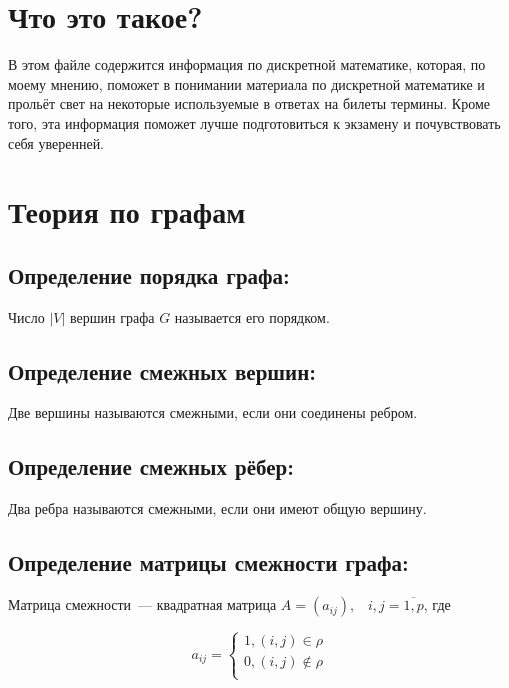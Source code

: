 \documentclass[14pt]{extarticle}
\begin{document}
\tableofcontents

\newpage

\section{Что это такое?}

В этом файле содержится информация по дискретной математике,
которая, по моему мнению, поможет в понимании материала по дискретной
математике и прольёт свет на некоторые используемые в ответах на билеты
термины. Кроме того, эта информация поможет лучше подготовиться к экзамену
и почувствовать себя уверенней.

\section{Теория по графам}

\subsection{Определение порядка графа:}

Число $|V|$ вершин графа $G$ называется его порядком.

\subsection{Определение смежных вершин:}

Две вершины называются смежными, если они соединены ребром.

\subsection{Определение смежных рёбер:}

Два ребра называются смежными, если они имеют общую вершину.

\subsection{Определение матрицы смежности графа:}

Матрица смежности~--- квадратная матрица $A = (a_{ij}), \;\;\; i, j = \overline{1, p}$,
где 

\[
    a_{ij} =
    \begin{cases}
        1, (i, j) \in \rho \\
        0, (i, j) \notin \rho\\
    \end{cases}  
\]
\end{document}
